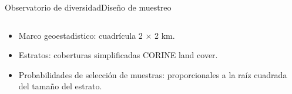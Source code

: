 \documentclass[aspectratio=169, 10pt]{beamer}
\begin{document}
\begin{frame}{Observatorio de diversidad}{Diseño de muestreo}
\begin{columns}
\begin{column}{0.5\textwidth}
\begin{itemize}
\item Marco geoestadistico: cuadrícula 2 $\times$ 2 km.
\item Estratos: coberturas simplificadas CORINE land cover.
\item Probabilidades de selección de muestras: proporcionales a la raíz cuadrada del tamaño del estrato.
\end{itemize}
\end{column}
\begin{column}{0.5\textwidth}




\end{column}
\end{columns}
\end{frame}
\end{document}

